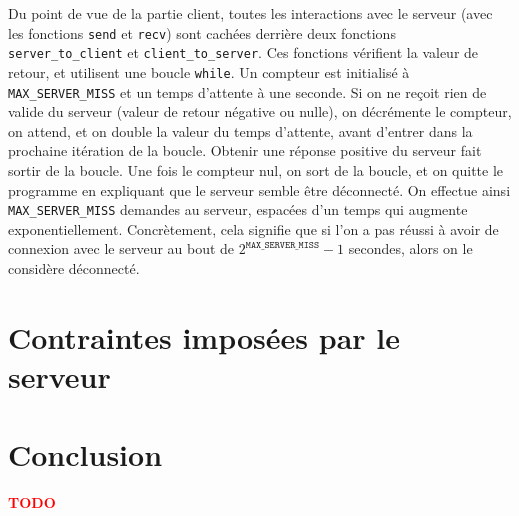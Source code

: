 \documentclass[a4paper]{article}
\newcommand{\TODO}{\textcolor{red}{\textbf{TODO}}}
\begin{document}
Du point de vue de la partie client, toutes les interactions avec le serveur (avec les fonctions \texttt{send} et \texttt{recv}) sont cachées derrière deux fonctions \texttt{server\_to\_client} et \texttt{client\_to\_server}. Ces fonctions vérifient la valeur de retour, et utilisent une boucle \texttt{while}. Un compteur est initialisé à \texttt{MAX\_SERVER\_MISS} et un temps d'attente à une seconde. Si on ne reçoit rien de valide du serveur (valeur de retour négative ou nulle), on décrémente le compteur, on attend, et on double la valeur du temps d'attente, avant d'entrer dans la prochaine itération de la boucle. Obtenir une réponse positive du serveur fait sortir de la boucle. Une fois le compteur nul, on sort de la boucle, et on quitte le programme en expliquant que le serveur semble être déconnecté. On effectue ainsi \texttt{MAX\_SERVER\_MISS} demandes au serveur, espacées d'un temps qui augmente exponentiellement. Concrètement, cela signifie que si l'on a pas réussi à avoir de connexion avec le serveur au bout de $2^{\texttt{MAX\_SERVER\_MISS}} - 1$ secondes, alors on le considère déconnecté. \\


\section{Contraintes imposées par le serveur}


\section*{Conclusion}

\TODO


 

\end{document}

